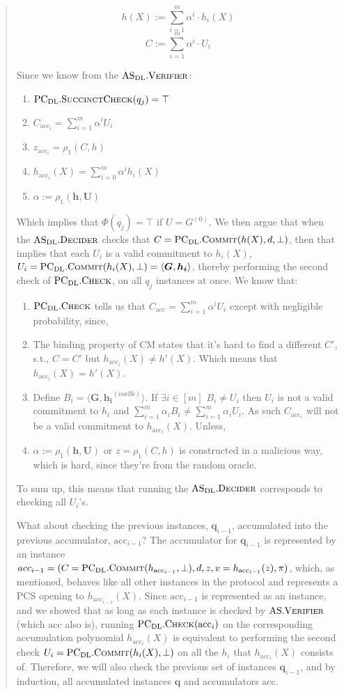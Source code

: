 \documentclass[
]{article}
\renewcommand*\a{\alpha}
\renewcommand{\vec}[1]{ \boldsymbol{#1} }
\newcommand{\ip}[2]{ \langle #1, #2 \rangle }
\newcommand*{\acc}{\mathrm{acc}}
\newcommand*{\Verifier}{\mathrm{\text{V\scriptsize ERIFIER}}}
\newcommand*{\Commit}{\mathrm{\text{C{\scriptsize OMMIT}}}}
\newcommand*{\AS}{\text{AS}}
\newcommand*{\ASVerifier}{\AS.\Verifier}
\newcommand*{\PCDL}{\text{PC}_{\text{DL}}}
\newcommand*{\PCDLCommit}{\PCDL.\Commit}
\newcommand*{\PCDLSuccinctCheck}{\PCDL.\mathrm{\text{S{\scriptsize UCCINCT}C{\scriptsize HECK}}}}
\newcommand*{\PCDLCheck}{\PCDL.\mathrm{\text{C\scriptsize HECK}}}
\newcommand*{\ASDL}{\text{AS}_{\text{DL}}}
\newcommand*{\ASDLVerifier}{\ASDL.\mathrm{\text{V\scriptsize ERIFIER}}}
\newcommand*{\ASDLDecider}{\ASDL.\mathrm{\text{D\scriptsize ECIDER}}}
\newcommand*{\CM}{\mathrm{\text{CM}}}
\begin{document}
\begin{quote}
$$h(X) := \sum^{m}_{i=1} \a^i \cdot h_i(X)$$
$$C := \sum^{m}_{i=1} \a^i \cdot U_i$$

Since we know from the $\ASDLVerifier$:

\begin{enumerate}
  \item $\PCDLSuccinctCheck(q_j) = \top$
  \item $C_{\acc_i} = \sum_{i=1}^m \a^i U_i$
  \item $z_{\acc_i} = \rho_1(C, h)$
  \item $h_{\acc_i}(X) = \sum_{i=0}^m \a^i h_i(X)$
  \item $\a := \rho_1(\vec{h}, \vec{U})$
\end{enumerate}

Which implies that $\Phi(q_j) = \top$ if $U = G^{(0)}$. We then argue that
when the $\ASDLDecider$ checks that $C = \PCDLCommit(h(X), d, \bot)$, then
that implies that each $U_i$ is a valid commitment to $h_i(X)$, $U_i =
\PCDLCommit(h_i(X), \bot) = \ip{\vec{G}}{\vec{h_i}}$, thereby performing
the second check of $\PCDLCheck$, on all $q_j$ instances at once. We know that:

\begin{enumerate}
  \item
    $\PCDLCheck$ tells us that $C_\acc = \sum_{i=1}^m \a^i U_i$ except with
    negligible probability, since,
  \item
    The binding property of $\CM$ states that it's hard to find a different
    $C'$, s.t., $C = C'$ but $h_{\acc_i}(X) \neq h'(X)$. Which means that
    $h_{\acc_i}(X) = h'(X)$.
  \item
    Define $B_i = \ip{\vec{G}}{\vec{h_i}^{(\text{coeffs})}}$. If $\exists i
    \in [m]$ $B_i \neq U_i$ then $U_i$ is not a valid commitment to $h_i$ and
    $\sum_{i=1}^m \a_i B_i \neq \sum_{i=1}^m \a_i U_i$. As such $C_{\acc_i}$
    will not be a valid commitment to $h_{\acc_i}(X)$. Unless,
  \item
    $\a := \rho_1(\vec{h}, \vec{U})$ or $z = \rho_1(C, h)$ is constructed
    in a malicious way, which is hard, since they're from the random oracle.
\end{enumerate}

To sum up, this means that running the $\ASDLDecider$ corresponds to checking
all $U_i$'s.

What about checking the previous instances, $\vec{q}_{i-1}$, accumulated into
the previous accumulator, $\acc_{i-1}$? The accumulator for $\vec{q}_{i-1}$
is represented by an instance $acc_{i-1} = (C = \PCDLCommit(h_{\acc_{i-1}},
\bot), d, z, v = h_{\acc_{i-1}}(z), \pi)$, which, as mentioned, behaves
like all other instances in the protocol and represents a PCS opening
to $h_{\acc_{i-1}}(X)$. Since $\acc_{i-1}$ is represented as an instance,
and we showed that as long as each instance is checked by $\ASVerifier$
(which $\acc$ also is), running $\PCDLCheck(\acc_i)$ on the corresponding
accumulation polynomial $h_{\acc_i}(X)$ is equivalent to performing the second
check $U_i = \PCDLCommit(h_i(X), \bot)$ on all the $h_i$ that $h_{\acc_i}(X)$
consists of. Therefore, we will also check the previous set of instances
$\vec{q}_{i-1}$, and by induction, all accumulated instances $\vec{q}$
and accumulators $\vec{\acc}$.


\end{quote}
\end{document}
